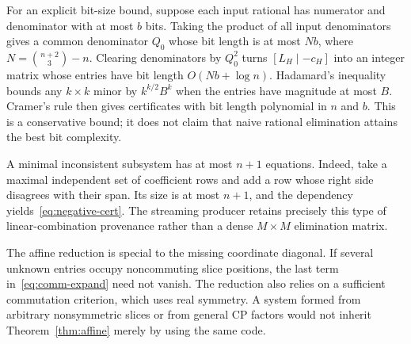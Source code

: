 For an explicit bit-size bound, suppose each input rational has numerator and denominator with at most $b$ bits. Taking the product of all input denominators gives a common denominator $Q_0$ whose bit length is at most $Nb$, where $N=\binom{n+2}{3}-n$. Clearing denominators by $Q_0^2$ turns $[L_H\mid-c_H]$ into an integer matrix whose entries have bit length $O(Nb+\log n)$. Hadamard's inequality bounds any $k\times k$ minor by $k^{k/2}B^k$ when the entries have magnitude at most $B$. Cramer's rule then gives certificates with bit length polynomial in $n$ and $b$. This is a conservative bound; it does not claim that naive rational elimination attains the best bit complexity.

A minimal inconsistent subsystem has at most $n+1$ equations. Indeed, take a maximal independent set of coefficient rows and add a row whose right side disagrees with their span. Its size is at most $n+1$, and the dependency yields~\eqref{eq:negative-cert}. The streaming producer retains precisely this type of linear-combination provenance rather than a dense $M\times M$ elimination matrix.

The affine reduction is special to the missing coordinate diagonal. If several unknown entries occupy noncommuting slice positions, the last term in~\eqref{eq:comm-expand} need not vanish. The reduction also relies on a sufficient commutation criterion, which uses real symmetry. A system formed from arbitrary nonsymmetric slices or from general CP factors would not inherit Theorem~\ref{thm:affine} merely by using the same code.
